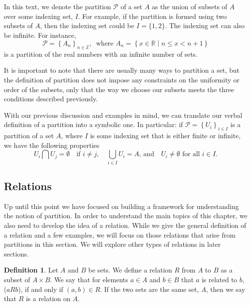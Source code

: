 \documentclass[
]{book}
\theoremstyle{definition}
\newtheorem{definition}{Definition}[chapter]
\theoremstyle{definition}
\theoremstyle{definition}
\theoremstyle{remark}
\begin{document}
In this text, we denote the partition \(\mathcal{P}\) of a set \(A\) as the union of subsets of \(A\) over some indexing set, \(I\). For example, if the partition is formed using two subsets of \(A\), then the indexing set could be \(I=\{1,2\}\). The indexing set can also be infinite. For instance,
\[\mathcal{P} = \left\{ A_n  \right\}_{n\in \mathbb{Z}}, \: \mbox{ where } A_n=\left\{x\in \mathbb{R}\middle \vert n\leq x < n+1  \right\}\] is a partition of the real numbers with an infinite number of sets.

It is important to note that there are usually many ways to partition a set, but the definition of partition does not impose any constraints on the uniformity or order of the subsets, only that the way we choose our subsets meets the three conditions described previously.

With our previous discussion and examples in mind, we can translate our verbal definition of a partition into a symbolic one. In particular: if \(\mathcal{P}= \left\{ U_i\right\}_{i\in I}\) is a partition of a set \(A\), where \(I\) is some indexing set that is either finite or infinite, we have the following properties
\[U_i \bigcap U_j = \emptyset \quad \mbox{if } i\neq j, \quad \bigcup_{i\in I} U_i = A \mbox{, and} \quad U_i \neq \emptyset \mbox{ for all } i \in I.\]

\hypertarget{relations}{%
\subsection{Relations}\label{relations}}

Up until this point we have focused on building a framework for understanding the notion of partition. In order to understand the main topics of this chapter, we also need to develop the idea of a relation. While we give the general definition of a relation and a few examples, we will focus on those relations that arise from partitions in this section. We will explore other types of relations in later sections.

\begin{definition}
\protect\hypertarget{def:unnamed-chunk-43}{}{\label{def:unnamed-chunk-43} }Let \(A\) and \(B\) be sets. We define a relation \(R\) from \(A\) to \(B\) as a subset of \(A\times B\). We say that for elements \(a\in A\) and \(b\in B\) that \(a\) is related to \(b\), (\(aRb\)), if and only if \((a,b)\in R\). If the two sets are the same set, \(A\), then we say that \(R\) is a relation on \(A\).
\end{definition}
\end{document}

